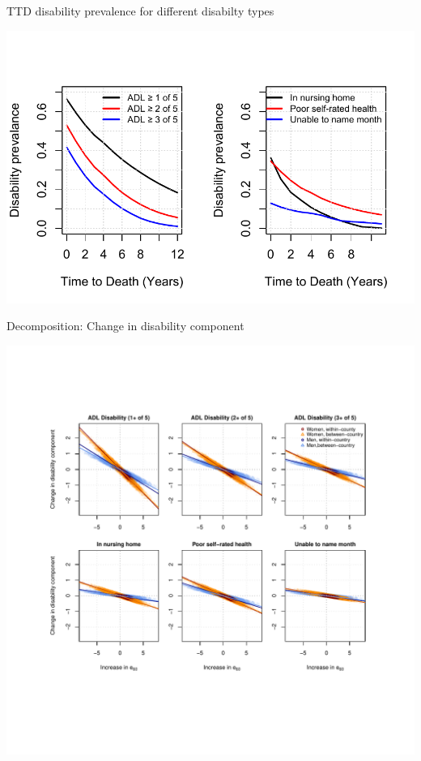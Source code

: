 \documentclass[20pt]{beamer}
\begin{document}
\begin{frame}{TTD disability prevalence for different disabilty types}
\begin{center}
\includegraphics[scale=1.3]{Figures/DisbyTTD_pres.pdf}
\end{center}
\end{frame}
\begin{frame}{Decomposition: Change in disability component}
\begin{center}
\includegraphics[trim=1cm 0 0 2.5cm, clip, scale=1.3]{Figures/Decomp_2x3.pdf}
\end{center}
\end{frame}
\end{document}
